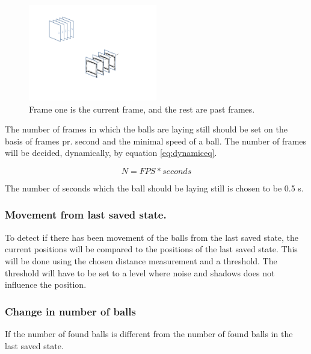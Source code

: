 \begin{figure}[H]
\begin{center}
\leavevmode
\includegraphics[width=0.5\textwidth]{images/image_seq_numbers}
\end{center}
\caption{Frame one is the current frame, and the rest are past frames.}
\label{fig:manyframes}
\end{figure}

The number of frames in which the balls are laying still should be set on the basis of frames pr. second and the minimal speed of a ball. The number of frames will be decided, dynamically, by equation \ref{eq:dynamiceq}.

\begin{equation}
N = FPS * seconds
\label{eq:dynamiceq}
\end{equation}

The number of seconds which the ball should be laying still is chosen to be 0.5 s.

\subsubsection{Movement from last saved state.}
To detect if there has been movement of the balls from the last saved state, the current positions will be compared to the positions of the last saved state. This will be done using the chosen distance measurement and a threshold. The threshold will have to be set to a level where noise and shadows does not influence the position.


\subsubsection{Change in number of balls}
If the number of found balls is different from the number of found balls in the last saved state.




